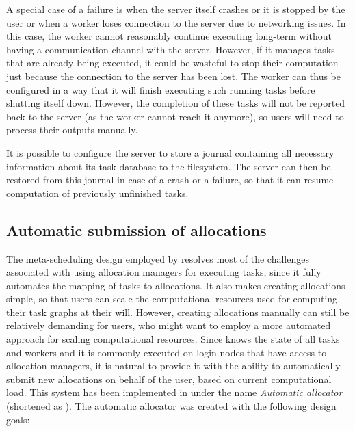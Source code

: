 A special case of a failure is when the server itself crashes or it is stopped by the user or when
a worker loses connection to the server due to networking issues. In this case, the worker cannot
reasonably continue executing long-term without having a communication channel with the server.
However, if it manages tasks that are already being executed, it could be wasteful to stop their
computation just because the connection to the server has been lost. The worker can thus be
configured in a way that it will finish executing such running tasks before shutting itself down.
However, the completion of these tasks will not be reported back to the server (as the worker
cannot reach it anymore), so users will need to process their outputs manually.

It is possible to configure the server to store a journal containing all necessary information
about its task database to the filesystem. The server can then be restored from this journal in
case of a crash or a failure, so that it can resume computation of previously unfinished tasks.

\subsection{Automatic submission of allocations}
\label{hq:automatic-allocation}
The meta-scheduling design employed by \hyperqueue{} resolves most of the challenges
associated with using allocation managers for executing tasks, since it fully automates the mapping
of tasks to allocations. It also makes creating allocations simple, so that users can scale the
computational resources used for computing their task graphs at their will. However, creating
allocations manually can still be relatively demanding for users, who might want to employ a more
automated approach for scaling computational resources. Since \hyperqueue{} knows the
state of all tasks and workers and it is commonly executed on login nodes that have access to
allocation managers, it is natural to provide it with the ability to automatically submit new
allocations on behalf of the user, based on current computational load. This system has been
implemented in \hq{} under the name \emph{Automatic allocator} (shortened as \autoalloc{}). The automatic
allocator was created with the following design goals:

